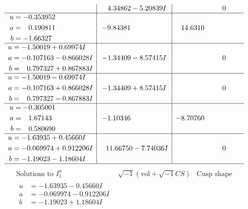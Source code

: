 \documentclass[1p]{elsarticle_modified}
\theoremstyle{definition}
\newcommand{\I}{\sqrt{-1}}
\begin{document}
$$\begin{array}{c|c|c}
 & \phantom{-}4.34862 - 5.20839 I & \phantom{-0.000000 } 0 \\ \hline\begin{aligned}
u &= -0.353952\phantom{ +0.000000I} \\
a &= \phantom{-}0.190811\phantom{ +0.000000I} \\
b &= -1.66327\phantom{ +0.000000I}\end{aligned}
 & -9.84381\phantom{ +0.000000I} & \phantom{-}14.6310\phantom{ +0.000000I} \\ \hline\begin{aligned}
u &= -1.50019 + 0.69974 I \\
a &= -0.107163 - 0.866028 I \\
b &= \phantom{-}0.797327 + 0.867883 I\end{aligned}
 & -1.34409 - 8.57415 I & \phantom{-0.000000 } 0 \\ \hline\begin{aligned}
u &= -1.50019 - 0.69974 I \\
a &= -0.107163 + 0.866028 I \\
b &= \phantom{-}0.797327 - 0.867883 I\end{aligned}
 & -1.34409 + 8.57415 I & \phantom{-0.000000 } 0 \\ \hline\begin{aligned}
u &= -0.305001\phantom{ +0.000000I} \\
a &= \phantom{-}1.67143\phantom{ +0.000000I} \\
b &= \phantom{-}0.580690\phantom{ +0.000000I}\end{aligned}
 & -1.10346\phantom{ +0.000000I} & -8.70760\phantom{ +0.000000I} \\ \hline\begin{aligned}
u &= -1.63935 + 0.45660 I \\
a &= -0.069974 + 0.912206 I \\
b &= -1.19023 - 1.18604 I\end{aligned}
 & \phantom{-}11.66750 - 7.74036 I & \phantom{-0.000000 } 0\\
 \hline 
 \end{array}$$\newpage$$\begin{array}{c|c|c}  
\text{Solutions to }I^u_{1}& \I (\text{vol} + \sqrt{-1}CS) & \text{Cusp shape}\\
 \hline 
\begin{aligned}
u &= -1.63935 - 0.45660 I \\
a &= -0.069974 - 0.912206 I \\
b &= -1.19023 + 1.18604 I\end{aligned}

\end{array}$$
\end{document}
